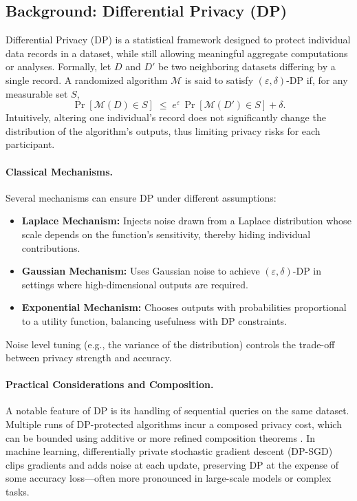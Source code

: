 \documentclass[10pt]{article}
\begin{document}
\subsection{Background: Differential Privacy (DP)}
\label{sec:dp_background}

Differential Privacy (DP) is a statistical framework designed to protect individual data records in a dataset, while still allowing meaningful aggregate computations or analyses. Formally, let $D$ and $D'$ be two neighboring datasets differing by a single record. A randomized algorithm $\mathcal{M}$ is said to satisfy $(\varepsilon,\delta)$-DP \cite{dwork2006calibrating} if, for any measurable set $S$,
\[
\Pr[\mathcal{M}(D) \in S] \;\le\; e^\varepsilon \,\Pr[\mathcal{M}(D') \in S] + \delta.
\]
Intuitively, altering one individual’s record does not significantly change the distribution of the algorithm’s outputs, thus limiting privacy risks for each participant.

\paragraph{Classical Mechanisms.}
Several mechanisms can ensure DP under different assumptions:
\begin{itemize}
    \item \textbf{Laplace Mechanism:} Injects noise drawn from a Laplace distribution whose scale depends on the function’s sensitivity, thereby hiding individual contributions.
    \item \textbf{Gaussian Mechanism:} Uses Gaussian noise to achieve $(\varepsilon, \delta)$-DP in settings where high-dimensional outputs are required.
    \item \textbf{Exponential Mechanism:} Chooses outputs with probabilities proportional to a utility function, balancing usefulness with DP constraints.
\end{itemize}
Noise level tuning (e.g., the variance of the distribution) controls the trade-off between privacy strength and accuracy.

\paragraph{Practical Considerations and Composition.}
A notable feature of DP is its handling of sequential queries on the same dataset. 
Multiple runs of DP-protected algorithms incur a composed privacy cost, which can be bounded using additive or more refined composition theorems \cite{dwork2014algorithmic}. In machine learning, differentially private stochastic gradient descent (DP-SGD) \cite{abadi2016deep} clips gradients and adds noise at each update, preserving DP at the expense of some accuracy loss—often more pronounced in large-scale models or complex tasks.
\end{document}
